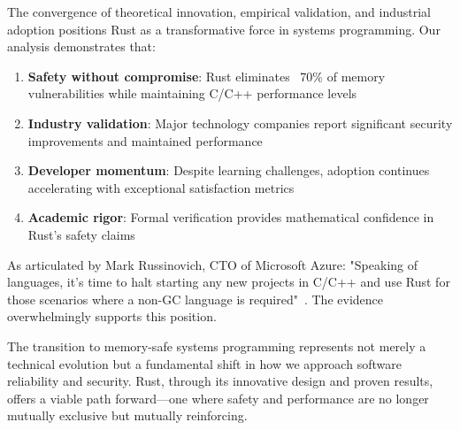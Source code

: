 \documentclass[11pt]{article}
\begin{document}
The convergence of theoretical innovation, empirical validation, and industrial adoption positions Rust as a transformative force in systems programming. Our analysis demonstrates that:

\begin{enumerate}
    \item \textbf{Safety without compromise}: Rust eliminates ~70\% of memory vulnerabilities while maintaining C/C++ performance levels
    \item \textbf{Industry validation}: Major technology companies report significant security improvements and maintained performance
    \item \textbf{Developer momentum}: Despite learning challenges, adoption continues accelerating with exceptional satisfaction metrics
    \item \textbf{Academic rigor}: Formal verification provides mathematical confidence in Rust's safety claims
\end{enumerate}

As articulated by Mark Russinovich, CTO of Microsoft Azure: "Speaking of languages, it's time to halt starting any new projects in C/C++ and use Rust for those scenarios where a non-GC language is required"~\cite{russinovich2022}. The evidence overwhelmingly supports this position.

The transition to memory-safe systems programming represents not merely a technical evolution but a fundamental shift in how we approach software reliability and security. Rust, through its innovative design and proven results, offers a viable path forward—one where safety and performance are no longer mutually exclusive but mutually reinforcing.
\end{document}
